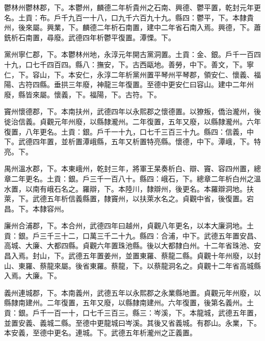 \begin{pinyinscope}
 鬱林州鬱林郡，下。本鬱州，麟德二年析貴州之石南、興德、鬱平置，乾封元年更名。土貢：布。戶千九百一十八，口九千六百九十九。縣四：鬱平，下。本隸貴州，後來屬。興業，下。麟德二年析石南置，建中二年省石南入焉。興德，下。蕭銑析石南置，尋廢。武德四年析鬱平復置。潭慄。下。



 黨州寧仁郡，下。本鬱林州地，永淳元年開古黨洞置。土貢：金、銀。戶千一百四十九，口七千四百四。縣八：撫安，下。古西甌地。善勞，中下。善文，下。寧仁，下。容山，下。本安仁，永淳二年析黨州置平琴州平琴郡，領安仁、懷義、福陽、古符四縣。垂拱三年廢，神龍三年復置。至德中更安仁曰容山。建中二年州廢，縣皆來屬。懷義，下。福陽，下。古符。下。



 竇州懷德郡，下。本南扶州，武德四年以永熙郡之懷德置。以獠叛，僑治瀧州，後徙治信義。貞觀元年州廢，以縣隸瀧州。二年復置，五年又廢，以縣隸瀧州。六年復置，八年更名。土貢：銀。戶千一十九，口七千三百三十九。縣四：信義，中下。武德四年置，並析置潭峨縣，五年又析置特亮縣。懷德，中下。潭峨，下。特亮。下。



 禺州溫水郡，下。本東峨州，乾封三年，將軍王杲奏析白、辯、竇、容四州置，總章二年更名。土貢：銀。戶三千一百八十。縣四：峨石，下。總章二年析白州之溫水置，以南有峨石名之。羅辯，下。本陸川，隸辯州，後更名。本羅辯洞地。扶萊，下。武德五年析信義縣置，隸竇州，以扶萊水名之。貞觀中省，後復置。宕昌。下。本隸容州。



 廉州合浦郡，下。本合州，武德四年曰越州，貞觀八年更名，以本大廉洞地。土貢：銀。戶三千三十二，口萬三千二十九。縣四：合浦，中下。武德五年置安昌、高城、大廉、大都四縣。貞觀六年置珠池縣。後以大都隸白州。十二年省珠池、安昌入焉。封山，下。武德五年置姜州，並置東羅、蔡龍二縣。貞觀十年州廢，以封山、東羅、蔡龍來屬。後省東羅。蔡龍，下。以蔡龍洞名之。貞觀十二年省高城縣入焉。大廉。下。



 義州連城郡，下。本南義州，武德五年以永熙郡之永業縣地置。貞觀元年州廢，以縣隸南建州。二年復置，五年又廢，以縣隸南建州。六年復置，後第名義州。土貢：銀。戶千一百一十，口七千三百三。縣三：岑溪，下。本龍城，武德五年置，並置安義、義城二縣。至德中更龍城曰岑溪。其後又省義城。有郡山。永業，下。本安義，至德中更名。連城。下。武德五年析瀧州之正義置。




\end{pinyinscope}
